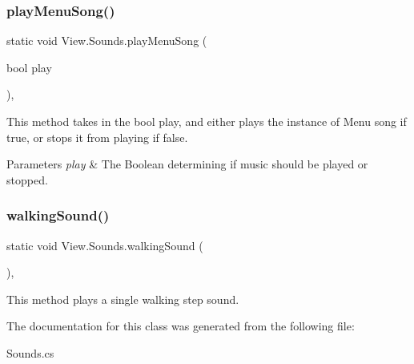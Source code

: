 \subsubsection{\texorpdfstring{play\+Menu\+Song()}{playMenuSong()}}
{\footnotesize\ttfamily static void View.\+Sounds.\+play\+Menu\+Song (\begin{DoxyParamCaption}\item[{bool}]{play }\end{DoxyParamCaption})\hspace{0.3cm}{\ttfamily [inline]}, {\ttfamily [static]}}

This method takes in the bool play, and either plays the instance of Menu song if true, or stops it from playing if false. 
\begin{DoxyParams}{Parameters}
{\em play} & The Boolean determining if music should be played or stopped. \\
\hline
\end{DoxyParams}
\hypertarget{class_view_1_1_sounds_aa798fd781b805d8497ff19819fe97088}{}\label{class_view_1_1_sounds_aa798fd781b805d8497ff19819fe97088} 
\subsubsection{\texorpdfstring{walking\+Sound()}{walkingSound()}}
{\footnotesize\ttfamily static void View.\+Sounds.\+walking\+Sound (\begin{DoxyParamCaption}{ }\end{DoxyParamCaption})\hspace{0.3cm}{\ttfamily [inline]}, {\ttfamily [static]}}

This method plays a single walking step sound. 

The documentation for this class was generated from the following file\+:\begin{DoxyCompactItemize}
\item 
Sounds.\+cs\end{DoxyCompactItemize}
